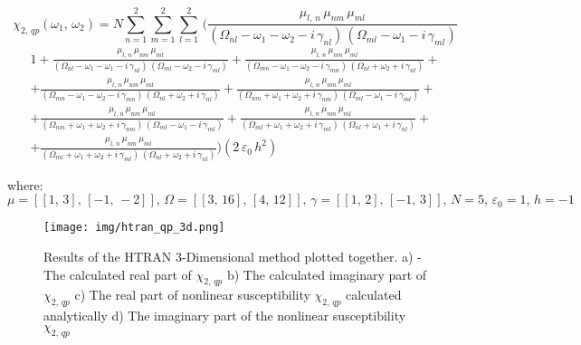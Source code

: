 \documentclass[12pt,twoside,a4paper]{article}
\numberwithin{equation}{subsection}
\numberwithin{figure}{subsection}
\begin{document}
\begin{equation}
  {\chi_{2, \,qp}}({\omega_{1}}, \,{\omega_{2}})=N \sum_{n=1}^{2} \sum_{m=1}^{2} \sum_{l=1}^{2}\,(
    \frac {{\mu_{l, \,n}}\,{\mu_{ nm}}\,{\mu_{ml}}}
      {({\Omega_{nl}} - \omega_1 - \omega_2 - i\,{\gamma_{nl}})\,({\Omega_{ml}} - \omega_1 - i\,{\gamma_{ml}})}
\end{equation}
\begin{alignat*}{1} 
  + \frac {{\mu_{l, \,n}}\,{\mu_{nm}}\,{\mu_{ml}}}
      {({\Omega_{nl}} - \omega_1 - \omega_1 - i\,{\gamma_{nl}})\,({\Omega_{ml}} - \omega_2 - i\,{\gamma_{ml}})} 
  + \frac {{\mu_{l, \,n}}\,{\mu_{nm}} \,{\mu_{ml}}}
      {({\Omega_{mn}} - \omega_1 - \omega_2 - i\,{\gamma_{mn}})\,({\Omega_{nl}} + \omega_2 + i\,{\gamma_{nl}})} 
+\\ + \frac {{\mu_{l, \,n}}\,{\mu_{nm}}\,{\mu_{ml}}}
      {({\Omega_{mn}} - \omega_1 - \omega_2 - i\,{\gamma_{mn}})\,({\Omega_{nl}} + \omega_2 + i\,{\gamma_{nl}})} 
  + \frac {{\mu_{l, \,n}}\,{\mu_{nm}}\,{\mu_{ml}}}
      {({\Omega_{nm}} + \omega_1 + \omega_2 + i\,{\gamma_{nm}})\,({\Omega_{ml}} - \omega_1 - i\,{\gamma_{ml}})} 
+\\ + \frac {{\mu_{l, \,n}}\,{\mu_{nm}}\,{\mu_{ml}}}
      {({\Omega_{nm}} + \omega_1 + \omega_2 + i\,{\gamma_{nm}})\,({\Omega_{ml}} - \omega_1 - i\,{\gamma_{ml}})} 
  + \frac {{\mu_{l, \,n}}\,{\mu_{nm}}\,{\mu_{ml}}}
      {({\Omega_{ml}} + \omega_1 + \omega_2 + i\,{\gamma_{ml}})\,({\Omega_{nl}} + \omega_1 + i\,{\gamma_{nl}})} 
+\\ + \frac {{\mu_{l, \,n}}\,{\mu_{nm}}\,{\mu_{ml}}}
      {({\Omega_{ml}} + \omega_1 + \omega_2 + i\,{\gamma_{ml}})\,({\Omega_{nl}} + \omega_2 + i\,{\gamma_{nl}})})  
      (2\,{ \varepsilon_{0}}\,h^{2})
\end{alignat*}

where: 
$\mu=[[1,\,3],\,[-1,\,-2]],\,\Omega=[[3,\,16],\,[4,\,12]],\,\gamma=[[1,\,2],\,[-1,\,3]],\,N=5,\,\varepsilon_{0}=1,\,h=-1$

 

\begin{figure}
  \texttt{[image: img/htran\_qp\_3d.png]}
  \caption{Results of the HTRAN 3-Dimensional method plotted together.  
     a) - The calculated real part of ${\chi_{2, \,qp}}$ 
     b) The calculated imaginary part of ${\chi_{2, \,qp}}$ 
     c) The real part of nonlinear susceptibility ${\chi_{2, \,qp}}$ calculated analytically 
     d) The imaginary part of the nonlinear susceptibility ${\chi_{2, \,qp}}$
     \label{htran_qp_3d}}
\end{figure}
\end{document}
